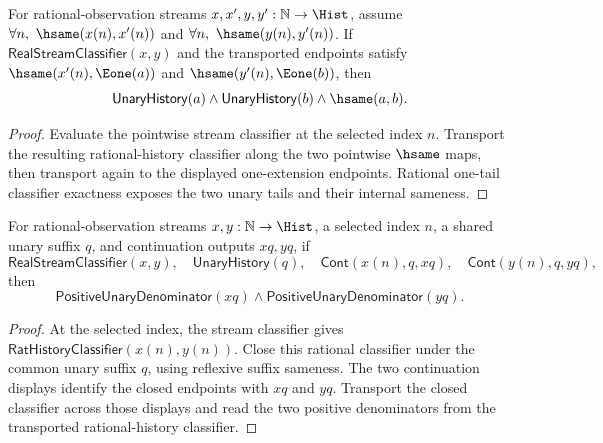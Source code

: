 \begin{theorem}
\label{thm:real-stream-classifier-hsame-e1-pair-readback}
For rational-observation streams $x,x',y,y':\mathbb{N}\to\Hist$, assume
$\forall n,\ \hsame(x(n),x'(n))$ and
$\forall n,\ \hsame(y(n),y'(n))$. If
$\mathsf{RealStreamClassifier}(x,y)$ and the transported endpoints satisfy
$\hsame(x'(n),\Eone(a))$ and $\hsame(y'(n),\Eone(b))$, then
$$
\mathsf{UnaryHistory}(a)\land \mathsf{UnaryHistory}(b)\land \hsame(a,b).
$$
\end{theorem}
\begin{proof}
Evaluate the pointwise stream classifier at the selected index $n$. Transport
the resulting rational-history classifier along the two pointwise $\hsame$
maps, then transport again to the displayed one-extension endpoints. Rational
one-tail classifier exactness exposes the two unary tails and their internal
sameness.
\end{proof}

\begin{theorem}
\label{thm:real-stream-classifier-selected-continuation-positive-denominators}
For rational-observation streams $x,y:\mathbb{N}\to\Hist$, a selected index
$n$, a shared unary suffix $q$, and continuation outputs $xq,yq$, if
$$
\mathsf{RealStreamClassifier}(x,y),\quad
\mathsf{UnaryHistory}(q),\quad
\mathsf{Cont}(x(n),q,xq),\quad
\mathsf{Cont}(y(n),q,yq),
$$
then
$$
\mathsf{PositiveUnaryDenominator}(xq)\land
\mathsf{PositiveUnaryDenominator}(yq).
$$
\end{theorem}
\begin{proof}
At the selected index, the stream classifier gives
$\mathsf{RatHistoryClassifier}(x(n),y(n))$. Close this rational classifier
under the common unary suffix $q$, using reflexive suffix sameness. The two
continuation displays identify the closed endpoints with $xq$ and $yq$.
Transport the closed classifier across those displays and read the two positive
denominators from the transported rational-history classifier.
\end{proof}

